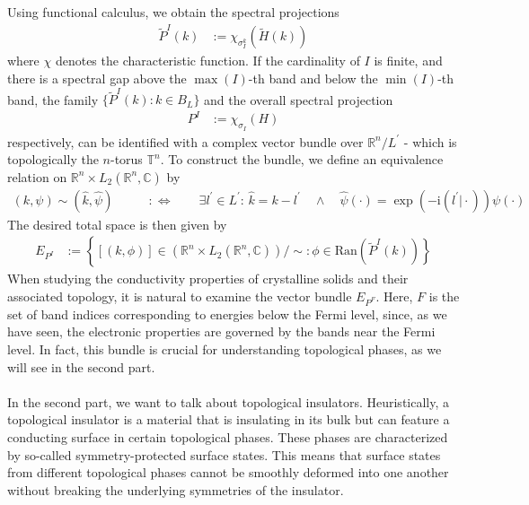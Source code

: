 Using functional calculus, we obtain the spectral projections
\begin{align*}
  \tilde{P}^{I}(k)
  &:=
  \chi_{\sigma_{I}^{k}}(\tilde{H}(k))
\end{align*}
where $\chi$ denotes the characteristic function.
If the cardinality of $I$ is finite, and there is a spectral gap above the $\max(I)$-th band and below the $\min(I)$-th band, the family $\lbrace \tilde{P}^{I}(k) \colon k \in B_{L} \rbrace$ and the overall spectral projection
\begin{align*}
  P^{I}
  &:=
  \chi_{\sigma_{I}}(H)
\end{align*}
respectively, can be identified with a complex vector bundle over $\mathbb{R}^{n}/L^{\prime}$ - which is topologically the $n$-torus $\mathbb{T}^{n}$.
To construct the bundle, we define an equivalence relation on $\mathbb{R}^{n} \times L_{2}(\mathbb{R}^{n},\mathbb{C})$ by
\begin{align*}
  (k,\psi)
  \sim
  (\hat{k},\hat{\psi})
  \qquad
  &:\Leftrightarrow
  \qquad
  \exists
  l^{\prime}
  \in
  L^{\prime}
  \colon
  \,
  \hat{k}
  =
  k
  -
  l^{\prime}
  \quad
  \land
  \quad
  \hat{\psi}(\cdot)
  =
  \exp(-\mathrm{i}(l^{\prime} \vert \cdot))
  \psi(\cdot)
\end{align*}
The desired total space is then given by
\begin{align*}
  E_{P^{I}}
  &:=
  \left\lbrace
      [(k,\phi)]
      \in
      \left(
        \mathbb{R}^{n}
        \times
        L_{2}(\mathbb{R}^{n},\mathbb{C})
      \right)
      /
      \sim
    \colon
      \phi
      \in
      \mathrm{Ran}(\tilde{P}^{I}(k))
  \right\rbrace
\end{align*}
When studying the conductivity properties of crystalline solids and their associated topology, it is natural to examine the vector bundle $E_{P^{F}}$.
Here, $F$ is the set of band indices corresponding to energies below the Fermi level, since, as we have seen, the electronic properties are governed by the bands near the Fermi level.
In fact, this bundle is crucial for understanding topological phases, as we will see in the second part.
\\\\
In the second part, we want to talk about topological insulators.
Heuristically, a topological insulator is a material that is insulating in its bulk but can feature a {\glqq}conducting{\grqq} surface in certain {\glqq}topological phases{\grqq}.
These phases are characterized by so-called symmetry-protected {\glqq}surface states.{\grqq}
This means that surface states from different topological phases cannot be smoothly {\glqq}deformed{\grqq} into one another without breaking the underlying symmetries of the insulator.
